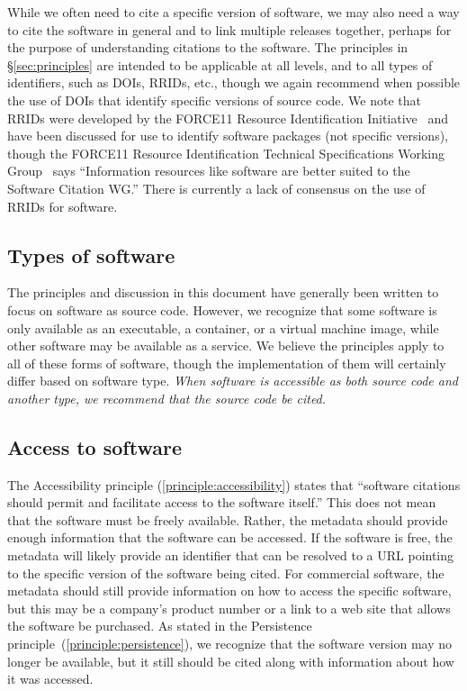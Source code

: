 \documentclass[12pt, oneside]{amsart}
\begin{document}
While we often need to cite a specific version of software, we may also need a way to cite the
software in general and to link multiple releases together, perhaps for
the purpose of understanding citations to the software.  The principles in \S\ref{sec:principles} are
intended to be applicable at all levels, and to all types of identifiers, such as DOIs, RRIDs, etc.,
though we again recommend when possible the use of DOIs that identify specific versions of
source code.  We note that RRIDs were developed by the FORCE11 Resource Identification Initiative~\cite{f11rii}
and have been discussed for use to identify software packages (not specific versions),
though the FORCE11 Resource Identification Technical Specifications Working
Group~\cite{f11rrridtswg} says ``Information resources like software are better suited to
the Software Citation WG.''
There is currently a lack of consensus on the use of RRIDs for software.

\subsection{Types of software}

The principles and discussion in this document have generally been written to focus on software
as source code.  However, we recognize that some software is only available as an executable, a container, or a virtual machine image, while other software may be available as a service.  We believe the principles apply to all of these forms of software, though the implementation of them will certainly differ based on software type.
\textit{When software is accessible as both source code and another type, we recommend that the source code be cited.}


\subsection{Access to software}
\label{sec:access}

The Accessibility principle (\ref{principle:accessibility}) states that ``software citations should permit and facilitate access to the software itself.''
This does not mean that the software must be freely available.
Rather, the metadata should provide enough information that the software can be accessed.
If the software is free, the metadata will likely provide an identifier that can be resolved to a URL pointing to the specific version of the software being cited.
For commercial software, the metadata should still provide information on how to access the specific software, but this may be a company's product number or a link to a web site that allows the software be purchased.
As stated in the Persistence principle~(\ref{principle:persistence}), we recognize that the software version may no longer be available, but it still should be cited along with information about how it was accessed.
\end{document}
